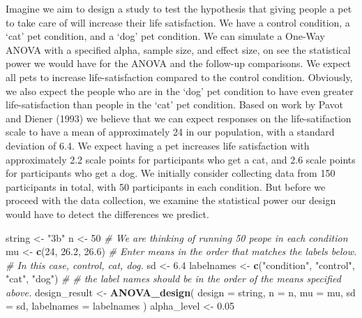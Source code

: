 \documentclass[
]{book}
\newenvironment{Shaded}{\begin{snugshade}}{\end{snugshade}}
\newcommand{\CommentTok}[1]{\textcolor[rgb]{0.56,0.35,0.01}{\textit{#1}}}
\newcommand{\DataTypeTok}[1]{\textcolor[rgb]{0.13,0.29,0.53}{#1}}
\newcommand{\DecValTok}[1]{\textcolor[rgb]{0.00,0.00,0.81}{#1}}
\newcommand{\FloatTok}[1]{\textcolor[rgb]{0.00,0.00,0.81}{#1}}
\newcommand{\KeywordTok}[1]{\textcolor[rgb]{0.13,0.29,0.53}{\textbf{#1}}}
\newcommand{\NormalTok}[1]{#1}
\newcommand{\StringTok}[1]{\textcolor[rgb]{0.31,0.60,0.02}{#1}}
\begin{document}
Imagine we aim to design a study to test the hypothesis that giving people a pet to take care of will increase their life satisfaction. We have a control condition, a `cat' pet condition, and a `dog' pet condition. We can simulate a One-Way ANOVA with a specified alpha, sample size, and effect size, on see the statistical power we would have for the ANOVA and the follow-up comparisons. We expect all pets to increase life-satisfaction compared to the control condition. Obviously, we also expect the people who are in the `dog' pet condition to have even greater life-satisfaction than people in the `cat' pet condition. Based on work by Pavot and Diener (1993) we believe that we can expect responses on the life-satifaction scale to have a mean of approximately 24 in our population, with a standard deviation of 6.4. We expect having a pet increases life satisfaction with approximately 2.2 scale points for participants who get a cat, and 2.6 scale points for participants who get a dog. We initially consider collecting data from 150 participants in total, with 50 participants in each condition. But before we proceed with the data collection, we examine the statistical power our design would have to detect the differences we predict.

\begin{Shaded}
\begin{Highlighting}[]
\NormalTok{string <-}\StringTok{ "3b"}
\NormalTok{n <-}\StringTok{ }\DecValTok{50}
\CommentTok{# We are thinking of running 50 peope in each condition}
\NormalTok{mu <-}\StringTok{ }\KeywordTok{c}\NormalTok{(}\DecValTok{24}\NormalTok{, }\FloatTok{26.2}\NormalTok{, }\FloatTok{26.6}\NormalTok{)}
\CommentTok{# Enter means in the order that matches the labels below.}
\CommentTok{# In this case, control, cat, dog.}
\NormalTok{sd <-}\StringTok{ }\FloatTok{6.4}
\NormalTok{labelnames <-}\StringTok{ }\KeywordTok{c}\NormalTok{(}\StringTok{"condition"}\NormalTok{, }\StringTok{"control"}\NormalTok{, }\StringTok{"cat"}\NormalTok{, }\StringTok{"dog"}\NormalTok{) }\CommentTok{#}
\CommentTok{# the label names should be in the order of the means specified above.}
\NormalTok{design_result <-}\StringTok{ }\KeywordTok{ANOVA_design}\NormalTok{(}
\DataTypeTok{design =}\NormalTok{ string,}
\DataTypeTok{n =}\NormalTok{ n,}
\DataTypeTok{mu =}\NormalTok{ mu,}
\DataTypeTok{sd =}\NormalTok{ sd,}
\DataTypeTok{labelnames =}\NormalTok{ labelnames}
\NormalTok{)}
\NormalTok{alpha_level <-}\StringTok{ }\FloatTok{0.05}
\end{Highlighting}
\end{Shaded}
\end{document}
